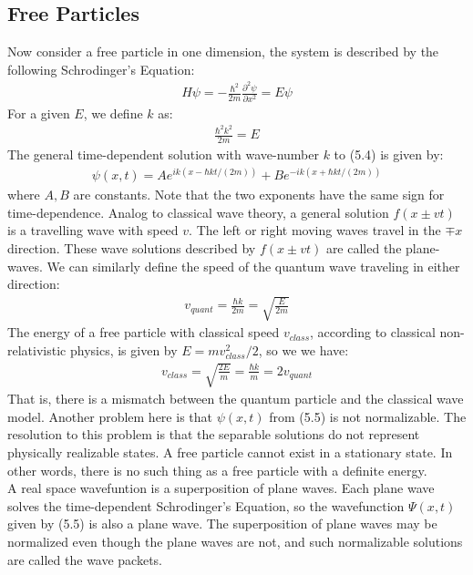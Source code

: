 \documentclass[11pt]{book}
\theoremstyle{break}
\theoremstyle{break}
\newcommand{\pd}{\partial}
\begin{document}
\subsection{Free Particles}
Now consider a free particle in one dimension, the system is described by the following Schrodinger's Equation:
\begin{align}
\hat{H}\psi = -\frac{\hbar^2}{2m}\frac{\pd^2 \psi}{\pd x^2} = E\psi
\end{align}
For a given $E$, we define $k$ as:
\begin{align*}
\frac{\hbar^2 k^2}{2m} = E
\end{align*}
The general time-dependent solution with wave-number $k$ to (5.4) is given by:
\begin{align}
\psi(x, t) = Ae^{ik(x-\hbar k t/(2m))} + B e^{-ik (x+ \hbar k t/(2m))}
\end{align}
where $A,B$ are constants. Note that the two exponents have the same sign for time-dependence. Analog to classical wave theory, a general solution $f(x\pm vt)$ is a travelling wave with speed $v$. The left or right moving waves travel in the $\mp x$ direction. These wave solutions described by $f(x\pm vt)$ are called the plane-waves. We can similarly define the speed of the quantum wave traveling in either direction:
\begin{align*}
v_{quant} = \frac{\hbar k}{2m} = \sqrt{\frac{E}{2m}}
\end{align*}
The energy of a free particle with classical speed $v_{class}$, according  to classical non-relativistic physics, is given by $E = mv_{class}^2/2$, so we we have:
\begin{align*}
v_{class} = \sqrt{\frac{2E}{m}} = \frac{\hbar k}{m} = 2v_{quant}
\end{align*}
That is, there is a mismatch between the quantum particle and the classical wave model. Another problem here is that $\psi(x,t) $ from (5.5) is not normalizable. The resolution to this problem is that the separable solutions do not represent physically realizable states. A free particle cannot exist in a stationary state. In other words, there is no such thing as a free particle with a
definite energy.\\

A real space wavefuntion is a superposition of plane waves.  Each plane wave solves the time-dependent Schrodinger's Equation, so the wavefunction $\Psi(x,t)$ given by (5.5) is also a plane wave. The superposition of plane waves may be normalized even though the plane waves are not, and such normalizable solutions are called the wave packets.\\
\end{document}
